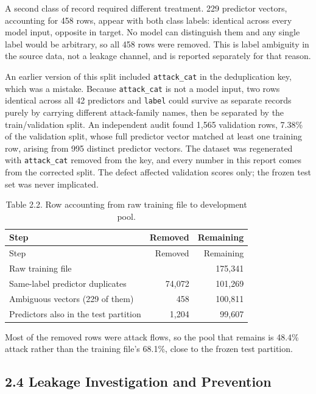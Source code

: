\documentclass[
  canadian,
  12pt,
]{article}
\let\reportOrigSubsection\subsection
\renewcommand{\subsection}{\par\Needspace*{8\baselineskip}\reportOrigSubsection}%
\begin{document}
A second class of record required different treatment. 229 predictor
vectors, accounting for 458 rows, appear with both class labels:
identical across every model input, opposite in target. No model can
distinguish them and any single label would be arbitrary, so all 458
rows were removed. This is label ambiguity in the source data, not a
leakage channel, and is reported separately for that reason.

An earlier version of this split included \texttt{attack\_cat} in the
deduplication key, which was a mistake. Because \texttt{attack\_cat} is
not a model input, two rows identical across all 42 predictors and
\texttt{label} could survive as separate records purely by carrying
different attack-family names, then be separated by the train/validation
split. An independent audit found 1,565 validation rows, 7.38\% of the
validation split, whose full predictor vector matched at least one
training row, arising from 995 distinct predictor vectors. The dataset
was regenerated with \texttt{attack\_cat} removed from the key, and
every number in this report comes from the corrected split. The defect
affected validation scores only; the frozen test set was never
implicated.

\begin{longtable}[]{@{}lrr@{}}
\caption{Table 2.2. Row accounting from raw training file to development
pool.}\tabularnewline
\toprule\noalign{}
Step & Removed & Remaining \\
\midrule\noalign{}
\endfirsthead
\toprule\noalign{}
Step & Removed & Remaining \\
\midrule\noalign{}
\endhead
\bottomrule\noalign{}
\endlastfoot
Raw training file & & 175,341 \\
Same-label predictor duplicates & 74,072 & 101,269 \\
Ambiguous vectors (229 of them) & 458 & 100,811 \\
Predictors also in the test partition & 1,204 & 99,607 \\
\end{longtable}

Most of the removed rows were attack flows, so the pool that remains is
48.4\% attack rather than the training file's 68.1\%, close to the
frozen test partition.

\subsection[\texorpdfstring{\numberline{2.4}Leakage Investigation and Prevention}{2.4 Leakage Investigation and Prevention}]{2.4 Leakage Investigation and Prevention}\label{sec-2-4}
\end{document}
